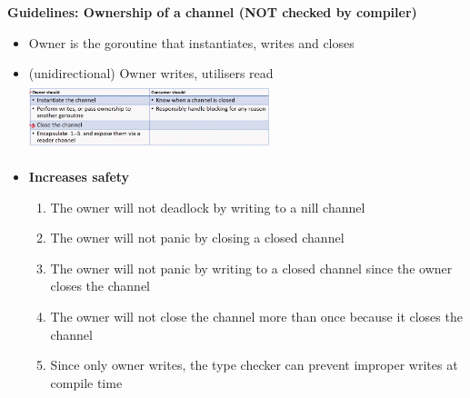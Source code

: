 \documentclass[10pt, landscape]{article}
\begin{document}
\begin{multicols}{4}
\textbf{Guidelines: Ownership of a channel (NOT checked by compiler)} \\
\begin{itemize}
    \item Owner is the goroutine that instantiates, writes and closes 
    \item (unidirectional) Owner writes, utilisers read
    \includegraphics*[width=7cm, height =2cm]{channelownership.png}
    \item \textbf{Increases safety}
    \begin{enumerate}
        \item The owner will not deadlock by writing to a nill channel 
        \item The owner will not panic by closing a closed channel 
        \item The owner will not panic by writing to a closed channel since the owner closes the channel 
        \item The owner will not close the channel more than once because it closes the channel 
        \item Since only owner writes, the type checker can prevent improper writes at compile time 
    \end{enumerate}
\end{itemize}


\end{multicols}
\end{document}
